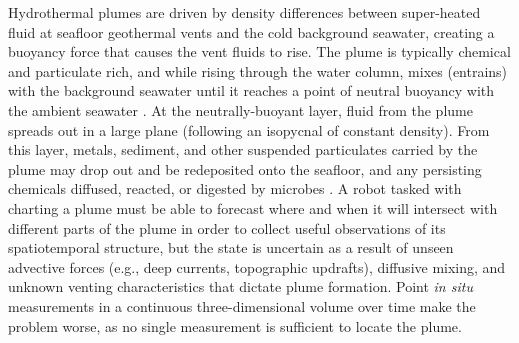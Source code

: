 Hydrothermal plumes are driven by density differences between super-heated fluid at seafloor geothermal vents and the cold background seawater, creating a buoyancy force that causes the vent fluids to rise. The plume is typically chemical and particulate rich, and while rising through the water column, mixes (entrains) with the background seawater until it reaches a point of neutral buoyancy with the ambient seawater \autocite{speer1989model,jakuba2007stochastic,morton1956turbulent,lavelle2013turbulent}. At the neutrally-buoyant layer, fluid from the plume spreads out in a large plane (following an isopycnal of constant density). From this layer, metals, sediment, and other suspended particulates carried by the plume may drop out and be redeposited onto the seafloor, and any persisting chemicals diffused, reacted, or digested by microbes \autocite{scholz2019shelf,dick2013microbiology}. A robot tasked with charting a plume must be able to forecast where and when it will intersect with different parts of the plume in order to collect useful observations of its spatiotemporal structure, but the state is uncertain as a result of unseen advective forces (e.g., deep currents, topographic updrafts), diffusive mixing, and unknown venting characteristics that dictate plume formation. Point \emph{in situ} measurements in a continuous three-dimensional volume over time make the problem worse, as no single measurement is sufficient to locate the plume. 

